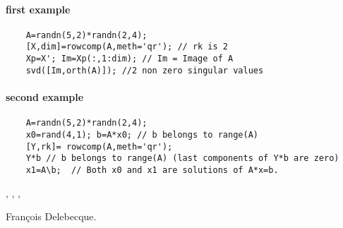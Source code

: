 \begin{examples}
\paragraph{first example}
  \begin{Verbatim}
    A=randn(5,2)*randn(2,4);
    [X,dim]=rowcomp(A,meth='qr'); // rk is 2 
    Xp=X'; Im=Xp(:,1:dim); // Im = Image of A 
    svd([Im,orth(A)]); //2 non zero singular values
  \end{Verbatim}
\paragraph{second example}
  \begin{Verbatim}
    A=randn(5,2)*randn(2,4);
    x0=rand(4,1); b=A*x0; // b belongs to range(A)  
    [Y,rk]= rowcomp(A,meth='qr');
    Y*b // b belongs to range(A) (last components of Y*b are zero)   
    x1=A\b;  // Both x0 and x1 are solutions of A*x=b.
  \end{Verbatim}
\end{examples}

\begin{manseealso}
  , , , 
\end{manseealso}

\begin{authors}
  Fran\c{c}ois Delebecque.
\end{authors}
